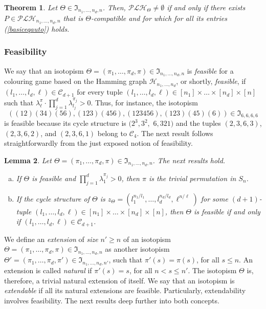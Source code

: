\documentclass{article}
\newtheorem{thm}{Theorem}
\newtheorem{lem}[thm]{Lemma}
\begin{document}
\begin{thm}\label{thm_PLH} Let $\Theta\in \mathfrak{I}_{n_1,\ldots,n_d,n}$. Then, $\mathcal{PLH}_{\Theta}\neq \emptyset$ if and only if there exists 
$P\in\mathcal{PLH}_{n_1,\ldots,n_d,n}$ that is $\Theta$-compatible and for which for all its entries (\ref{basiceqauto}) holds.
\end{thm}

\subsubsection{Feasibility}

We say that an isotopism $\Theta=(\pi_1,\ldots,\pi_d,\pi)\in \mathfrak{I}_{n_1,\ldots,n_d,n}$ is {\em feasible} for a colouring game based on the Hamming graph 
$\mathcal{H}_{n_1,\ldots,n_d}$, or shortly, {\em feasible}, if $(l_1,\ldots,l_d,\ell)\in\mathcal{C}_{d+1}$ for every tuple $(l_1,\ldots,l_d,\ell)\in [n_1]\times\ldots\times
[n_d]\times [n]$ such that $\lambda_{\ell}^{\pi}\cdot \prod_{j=1}^d\lambda_{l_j}^{\pi_j}>0$. Thus, for instance, the isotopism 
\[((12)(34)(56),(123)(456),(123456),(123)(45)(6))\in\mathfrak{I}_{6,6,6,6}\] 
is feasible because its cycle structure is $(2^3,3^2,$ $6,321)$ and the tuples $(2,3,6,3)$, $(2,3,6,2)$, 
and $(2,3,6,1)$ belong to $\mathcal{C}_4$. The next result follows straightforwardly from the just exposed notion of feasibility.

\begin{lem}\label{lem_feasible} Let $\Theta=(\pi_1,\ldots,\pi_d,\pi)\in\mathfrak{I}_{n_1,\ldots,n_d,n}$. The next results hold.
\begin{enumerate}[a)]
\item If $\Theta$ is feasible and $\prod_{j=1}^d\lambda_1^{\pi_j}>0$, then $\pi$ is the trivial permutation in $S_n$.
 \item If the cycle structure of $\Theta$ is $z_{\Theta}=(l_1^{n_1/l_1},\ldots, l_d^{n_d/l_d}, {\ell}^{n/\ell})$ for some $(d+1)$-tuple $(l_1,\ldots,l_d,\ell)\in 
[n_1]\times\ldots\times [n_d]\times [n]$, then $\Theta$ is feasible if and only if $(l_1,\ldots,l_d,\ell)\in\mathcal{C}_{d+1}$.
\end{enumerate}
\end{lem}

\vspace{0.1cm}

We define an \emph{extension} of {\em size} $n'\geq n$ of an isotopism $\Theta=(\pi_1,\ldots,\pi_d,\pi)\in \mathfrak{I}_{n_1,\ldots,n_d,n}$ as another isotopism 
$\Theta'=(\pi_1,\ldots,\pi_d,\pi')\in \mathfrak{I}_{n_1,\ldots,n_d,n'}$, such that $\pi'(s)=\pi(s)$, for all $s\leq n$. An extension is called \emph{natural} if $\pi'(s)=s$, for all 
$n<s\leq n'$. The 
isotopism $\Theta$ is, therefore, a trivial natural extension of itself. We say that an isotopism is \emph{extendable} if all its natural extensions are feasible. Particularly, extendability involves feasibility. The next results deep further into both concepts.
\end{document}

